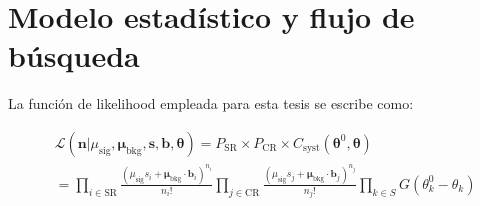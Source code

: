 

\section{Modelo estadístico y flujo de búsqueda}

La función de likelihood empleada para esta tesis se escribe como:


\begin{equation}
	\begin{split}
	& \mathcal{L} (\textbf{n} | \mu_\text{sig}, \bm{\mu}_{\text{bkg}}, \textbf{s}, \textbf{b}, \bm{\theta}) = P_\text{SR} \times P_\text{CR} \times  C_\text{syst} (\bm{\theta}^0, \bm{\theta}) \\
	& = \prod_{i \in \text{SR}} \frac{(\mu_\text{sig} s_i + \bm{\mu}_{\text{bkg}} \cdot \textbf{b}_i)^{n_i}}{n_i!} \prod_{j \in \text{CR}} \frac{(\mu_\text{sig} s_j + \bm{\mu}_{\text{bkg}} \cdot \textbf{b}_j)^{n_j}}{n_j!} \prod_{k \in S} G(\theta_k^0 - \theta_k) \\
	\end{split}
	\label{eq:analysis_lh}
\end{equation}


